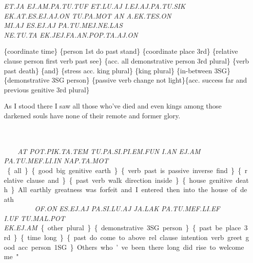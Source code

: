 {{\it ET.JA EJ.AM.PA.TU.TUF ET.LU.AJ I.EJ.AJ.PA.TU.SIK \\EK.AT.ES.EJ.AJ.ON TU.PA.MOT AN A.EK.TES.ON \\ MI.AJ ES.EJ.AJ PA.TU.MEJ.NE.LAS \\NE.TU.TA EK.JEJ.FA.AN.POP.TA.AJ.ON }


\{coordinate time\} \{person 1st do past stand\} \{coordinate place 3rd\} \{relative clause person first verb past see\} \{acc. all demonstrative person 3rd plural\} \{verb past death\} \{and\} \{stress acc. king plural\} \{king plural\} \{in-between 3SG\} \{demonstrative 3SG person\} \{passive verb change not light\}\{acc. success far and previous genitive 3rd plural\}

As I stood there I saw all those who've died and even kings among those darkened souls have none of their remote and former glory. 
 
\drie 

\at ~ \pot\pik\ta\tem ~ \tu\pa\si\Atlanpi\Atlanem\fun ~ \Atlani\an ~ \ej\am ~ \\\pa\tu\mef\li\Atlanin~ \\\nap\ta\mot

{\it AT POT.PIK.TA.TEM TU.PA.SI.PI.EM.FUN I.AN EJ.AM \\PA.TU.MEF.LI.IN NAP.TA.MOT }


\{all\} \{good big genitive earth\} \{verb past is passive inverse find\} \{relative clause and\} \{past verb walk direction inside\} \{house genitive death\} 

All earthly greatness was forfeit and I entered then into the house of death.  
 
 
\drie


\of\on ~ \es\ej\aj ~ \pa\si\lu\aj ~ \ja\lak ~ \pa\tu\mef\li\ef~\\\Atlani\uf~\tu\mal\pot~\ek\ej\am 

{\it OF.ON ES.EJ.AJ PA.SI.LU.AJ JA.LAK PA.TU.MEF.LI.EF \\I.UF TU.MAL.POT EK.EJ.AM} 


\{other plural\} \{demonstrative 3SG person\} \{past be place 3rd\} \{time long\} \{past do come to above rel.clause intention verb greet good acc. person 1SG\}

Others who’ve been there long did rise to welcome me." 


}

